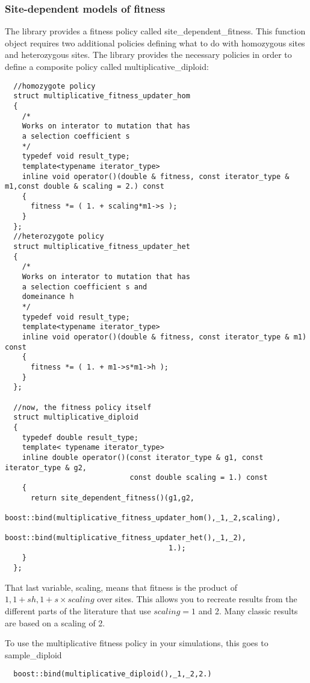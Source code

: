 \documentclass{article}
\begin{document}
\subsubsection{Site-dependent models of fitness}
The library provides a fitness policy called site\_dependent\_fitness.  This function object requires two additional policies defining what to do with homozygous sites and heterozygous sites.  The library provides the necessary policies in order to define a composite policy called multiplicative\_diploid:
\begin{lstlisting}
  //homozygote policy
  struct multiplicative_fitness_updater_hom
  {
    /*
    Works on interator to mutation that has
    a selection coefficient s
    */
    typedef void result_type;
    template<typename iterator_type>
    inline void operator()(double & fitness, const iterator_type & m1,const double & scaling = 2.) const
    {
      fitness *= ( 1. + scaling*m1->s );
    }
  };
  //heterozygote policy
  struct multiplicative_fitness_updater_het
  {
    /*
    Works on interator to mutation that has
    a selection coefficient s and 
    domeinance h
    */
    typedef void result_type;
    template<typename iterator_type>
    inline void operator()(double & fitness, const iterator_type & m1) const
    {
      fitness *= ( 1. + m1->s*m1->h );
    }
  };

  //now, the fitness policy itself
  struct multiplicative_diploid
  {
    typedef double result_type;
    template< typename iterator_type>
    inline double operator()(const iterator_type & g1, const iterator_type & g2,
                             const double scaling = 1.) const
    {
      return site_dependent_fitness()(g1,g2,
                                      boost::bind(multiplicative_fitness_updater_hom(),_1,_2,scaling),
                                      boost::bind(multiplicative_fitness_updater_het(),_1,_2),
                                      1.);
    }
  };
\end{lstlisting}

That last variable, scaling, means that fitness is the product of $1, 1+sh, 1+s \times scaling$ over sites.  This allows you to recreate results from the different parts of the literature that use $scaling = 1$ and 2.  Many classic results are based on a scaling of 2.

To use the multiplicative fitness policy in your simulations, this goes to sample\_diploid
\begin{lstlisting}
  boost::bind(multiplicative_diploid(),_1,_2,2.)
\end{lstlisting}
\end{document}
